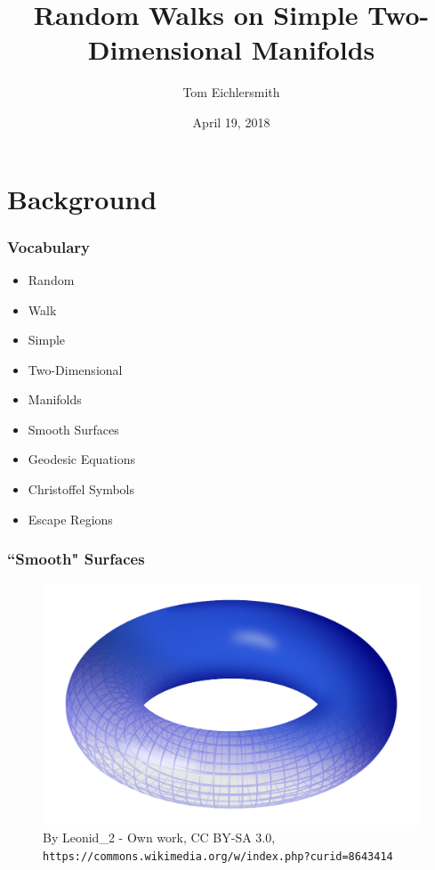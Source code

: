 \documentclass{beamer}
\title[Random Walks]{Random Walks on Simple Two-Dimensional Manifolds} %
\author{Tom Eichlersmith}
\institute[Hamline U]
{
Hamline University \\
\medskip
\texttt{teichlersmith01@hamline.edu}
}
\date{April 19, 2018}
\begin{document}
\begin{frame}
	\titlepage %
\end{frame}


\section{Background} 

\begin{frame}

	\frametitle{Vocabulary}
	
	\begin{itemize}
		\item Random
		\item Walk
		\item Simple
		\item Two-Dimensional
		\item Manifolds
		\item Smooth Surfaces
		\item Geodesic Equations
		\item Christoffel Symbols
		\item Escape Regions
	\end{itemize}

\end{frame}


\begin{frame}

	\frametitle{``Smooth" Surfaces}
	
	\begin{figure}
		\includegraphics[width=\textwidth]{images/Torus.png}
		\caption{By Leonid\_2 - Own work, CC BY-SA 3.0, \texttt{https://commons.wikimedia.org/w/index.php?curid=8643414}}
	\end{figure}
	
\end{frame}
\end{document}
